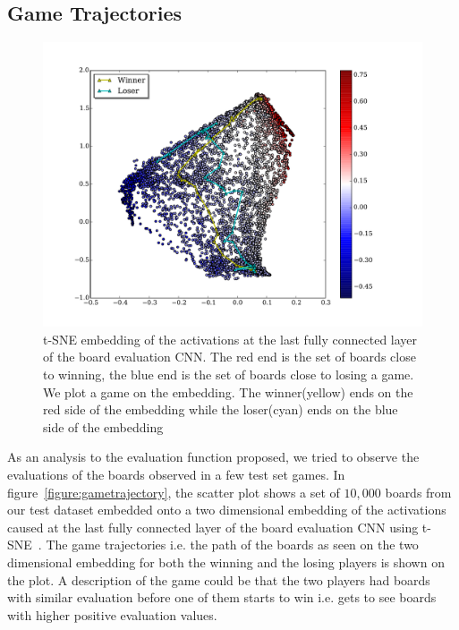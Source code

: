 \subsection{Game Trajectories}
\begin{figure}[H]
  \hspace*{-1.0in}
 \includegraphics[width=1.5\textwidth]{plots/board_evals_win.pdf}
 \caption[Game Trajectories]{t-SNE embedding of the activations at the last 
fully connected layer of the board evaluation CNN. The red end is the set of 
boards close to winning, the blue end is the set of boards close to losing 
a game. We plot a game on the embedding. The winner(yellow) ends on the red 
side of the embedding while the loser(cyan) ends on the blue side of the 
embedding}
\end{figure}
\label{subsection:trajectories}
As an analysis to the evaluation function proposed, we tried to observe the 
evaluations of the boards observed in a few test set games. In 
figure~\ref{figure:gametrajectory}, the scatter plot shows a set of $10,000$ 
boards from our test dataset embedded onto a two dimensional embedding of 
the activations caused at the last fully connected layer of the board 
evaluation CNN using t-SNE~\cite{tsne}. The game trajectories i.e. the path of 
the boards as seen on the two dimensional embedding for both the winning and 
the losing players is shown on the plot. A description of the game could be that 
the two players had boards with similar evaluation before one of them starts to 
win i.e. gets to see boards with higher positive evaluation values.\\




